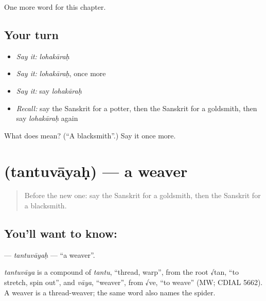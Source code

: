 \begin{grammarlens}[title={What you've built}]
One more word for this chapter.
\end{grammarlens}

\subsection*{Your turn}
\begin{itemize}
\raggedright
  \item \emph{Say it:} \emph{lohakāraḥ}
  \item \emph{Say it:} \emph{lohakāraḥ}, once more
  \item \emph{Say it:} say \emph{lohakāraḥ}
  \item \emph{Recall:} say the Sanskrit for a potter, then the Sanskrit for a goldsmith, then say \emph{lohakāraḥ} again
\end{itemize}

\begin{tcolorbox}[breakable,colback=teal!4,colframe=teal!35!black,title={Before you move on}]
What does  mean? (\textquotedblleft{}A blacksmith\textquotedblright{}.) Say it once more.
\end{tcolorbox}
\section[\texorpdfstring{\sk{तन्तुवायः} (tantuvāyaḥ)}{तन्तुवायः (tantuvāyaḥ)}]{ (tantuvāyaḥ) — a weaver}

\label{lesson:SA-C237-tantuvayah}



\begin{quote}
Before the new one: say the Sanskrit for a goldsmith, then the Sanskrit for a blacksmith.
\end{quote}

\subsection*{You'll want to know: }
\textbf{} — \emph{tantuvāyaḥ} — \textquotedblleft{}a weaver\textquotedblright{}.

\begin{cousinweb}
\emph{tantuvāya} is a compound of \emph{tantu}, \textquotedblleft{}thread, warp\textquotedblright{}, from the root √tan, \textquotedblleft{}to stretch, spin out\textquotedblright{}, and \emph{vāya}, \textquotedblleft{}weaver\textquotedblright{}, from √ve, \textquotedblleft{}to weave\textquotedblright{} (MW; CDIAL 5662). A weaver is a thread-weaver; the same word also names the spider.
\end{cousinweb}

